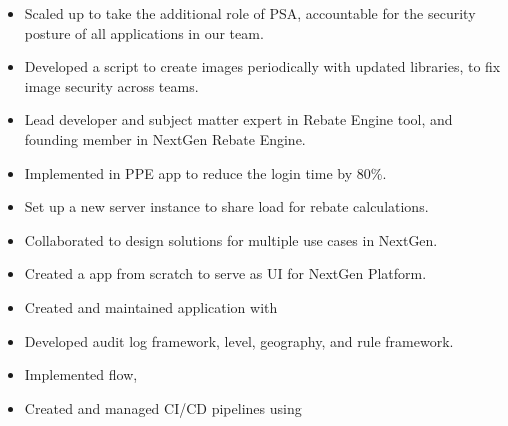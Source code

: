 \documentclass[10pt,a4paper,ragged2e, normalphoto]{altacv}
\begin{document}
\begin{itemize}
  \item Scaled up to take the additional role of PSA, accountable for the security posture of all applications in our team.
  \item Developed a script to create images periodically with updated libraries, to fix image security across teams.
 \end{itemize}
\begin{itemize}
  \item Lead developer and subject matter expert in Rebate Engine tool, and founding member in NextGen Rebate Engine.
  \item Implemented in PPE app to reduce the login time by 80\%.
  \item Set up a new server instance to share load for rebate calculations.
  \item Collaborated to design solutions for multiple use cases in NextGen.
  \item Created a app from scratch to serve as UI for NextGen Platform.
 \end{itemize}
\begin{itemize}
	\item Created and maintained application with 
	\item Developed audit log framework, level, geography, and rule framework.
	\item Implemented flow, \
	\item Created and managed CI/CD pipelines using 
 \end{itemize}
\end{document}
